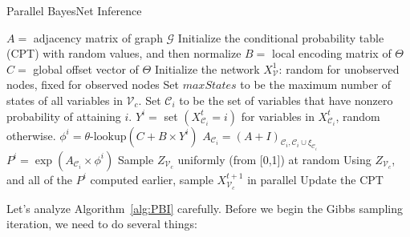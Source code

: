 \documentclass{article} %
\begin{document}
\begin{algorithm}
\caption{Parallel BayesNet Inference}
\begin{algorithmic}[1]
\State $A =$ adjacency matrix of graph $\mathcal{G}$
\State Initialize the conditional probability table (CPT) with random values, and then normalize
\State $B =$ local encoding matrix of $\Theta$
\State $C =$ global offset vector of $\Theta$
\State Initialize the network $X^1_{\mathcal{V}}$: random for unobserved nodes, fixed for observed nodes
\State Set $maxStates$ to be the maximum number of states of all variables in $\mathcal{V}_c$.
\State Set $\mathcal{C}_i$ to be the set of variables that have nonzero probability of attaining $i$.
\State $Y^i =$ set $(X^t_{\mathcal{C}_i} = i)$ for variables in $X^t_{\mathcal{C}_i}$, random otherwise.
\State $\phi^i = \text{$\theta$-lookup} (C + B \times Y^i ) $
\State $A_{\mathcal{C}_i} = (A + I)_{\mathcal{C}_i, \mathcal{C}_i \cup \xi_{\mathcal{C}_i}}$
\State $P^i = \exp\left(A_{\mathcal{C}_i} \times \phi^i\right)$
\EndFor
\State Sample $Z_{\mathcal{V}_c}$ uniformly (from [0,1]) at random
\State Using $Z_{\mathcal{V}_c}$, and all of the $P^i$ computed earlier, sample $X^{t+1}_{\mathcal{V}_c}$ in parallel
\State Update the CPT
\EndFor
\EndFor
\end{algorithmic}
\label{alg:PBI}
\end{algorithm}

Let's analyze Algorithm~\ref{alg:PBI} carefully. Before we begin the Gibbs sampling iteration, we need
to do several things:
\end{document}
